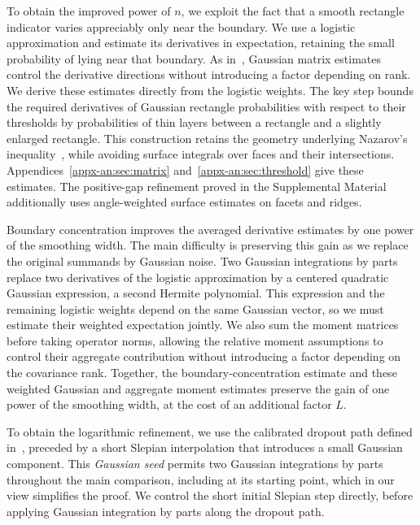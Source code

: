 \documentclass[11pt,letterpaper,twoside,leqno]{article}
\theoremstyle{bookplain}
\theoremstyle{bookremark}
\begin{document}
To obtain the improved power of \(n\), we exploit the fact that a
smooth rectangle indicator varies appreciably only near the boundary.
We use a logistic approximation and estimate its derivatives in
expectation, retaining the small probability of lying near that
boundary. As in~\cite{GaoZhang}, Gaussian matrix estimates control
the derivative directions without introducing a factor depending on
rank. We derive these estimates directly from the logistic weights.
The key step bounds the required derivatives of Gaussian rectangle
probabilities with respect to their thresholds by probabilities of
thin layers between a rectangle and a slightly enlarged rectangle.
This construction retains the geometry underlying Nazarov's
inequality~\cite{Nazarov2003,CCK17N}, while avoiding surface integrals
over faces and their intersections. Appendices~\ref{appx-an:sec:matrix}
and~\ref{appx-an:sec:threshold} give these estimates.
The positive-gap refinement proved in the Supplemental
Material~\cite[Appendix~H]{Supplement2026}
additionally uses angle-weighted surface estimates on facets and ridges.

Boundary concentration improves the averaged derivative estimates
by one power of the smoothing width. The main difficulty is
preserving this gain as we replace the original summands by Gaussian
noise. Two Gaussian integrations by parts replace two derivatives
of the logistic approximation by a centered quadratic Gaussian
expression, a second Hermite polynomial. This expression and the
remaining logistic weights depend on the same Gaussian vector, so
we must estimate their weighted expectation jointly. We also sum
the moment matrices before taking operator norms, allowing the
relative moment assumptions to control their aggregate contribution
without introducing a factor depending on the covariance rank.
Together, the boundary-concentration estimate and these weighted
Gaussian and aggregate moment estimates preserve the gain of one
power of the smoothing width, at the cost of an additional factor
\(L\).

To obtain the logarithmic refinement, we use the calibrated dropout
path defined in~\cite[Section~4]{AL}, preceded by a short Slepian
interpolation that introduces a small Gaussian component. This
\emph{Gaussian seed} permits two Gaussian integrations by parts
throughout the main comparison, including at its starting point,
which in our view simplifies the proof. We control the short initial
Slepian step directly, before applying Gaussian integration by parts
along the dropout path.
\end{document}
